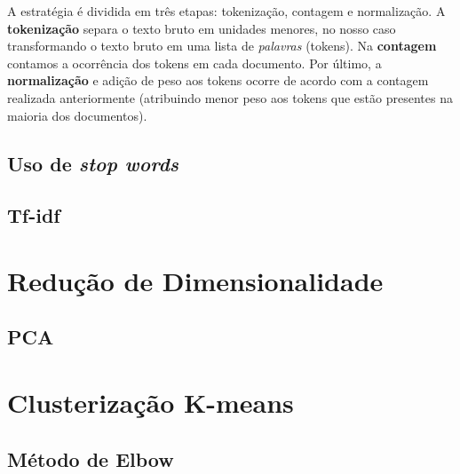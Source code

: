  A estratégia é dividida em três etapas: tokenização, contagem e normalização.
 A \textbf{tokenização} separa o texto bruto em unidades menores, no nosso caso transformando o texto bruto em uma lista de \emph{palavras} (tokens).
 Na \textbf{contagem} contamos a ocorrência dos tokens em cada documento.
 Por último, a \textbf{normalização} e adição de peso aos tokens ocorre de acordo com a contagem realizada anteriormente (atribuindo menor peso aos tokens que estão presentes na maioria dos documentos).
 
 \subsection{Uso de \emph{stop words}}
 \subsection{Tf-idf}
 
 \section{Redução de Dimensionalidade}
 \subsection{PCA}
 
 \section{Clusterização K-means}
 
 \subsection{Método de Elbow}
 
 
 
 


